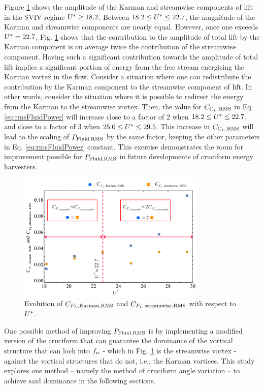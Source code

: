\documentclass[oneside]{utmthesis}
\begin{document}
Figure \ref{fig:karmanStreamwiseComponents} shows the \rms{} amplitude of the Karman and streamwise components of lift in the SVIV regime $U^{*} \geq 18.2$. Between $18.2 \leq U^{*} \leq 22.7$, the magnitude of the Karman and streamwise components are nearly equal. However, once one exceeds $U^{*} = 22.7$, Fig. \ref{fig:karmanStreamwiseComponents} shows that the contribution to the \rms{} amplitude of total lift by the Karman component is on average twice the contribution of the streamwise component. Having such a significant contribution towards the \rms{} amplitude of total lift implies a significant portion of energy from the free stream energising the Karman vortex in the flow. Consider a situation where one can redistribute the contribution by the Karman component to the streamwise component of lift. In other words, consider the situation where it is possible to redirect the energy from the Karman to the streamwise vortex. Then, the value for $C_{\text{C}_{L},\text{RMS}}$ in Eq. \ref{eq:rmsFluidPower} will increase close to a factor of 2 when $18.2 \leq U^{*} \leq 22.7$, and close to a factor of 3 when $25.0 \leq U^{*} \leq 29.5$. This increase in $C_{\text{C}_{L},\text{RMS}}$ will lead to the scaling of $P_{\text{Fluid,RMS}}$ by the same factor, keeping the other parameters in Eq. \ref{eq:rmsFluidPower} constant. This exercise demonstrates the room for improvement possible for $P_{\text{Fluid,RMS}}$ in future developments of cruciform energy harvesters.

\begin{figure}[H]
  \centering
  \includegraphics[width=0.8\textwidth]{figs/karmanStreamwiseComponents}
  \caption{Evolution of $C_{F_{L},\text{Karman},\text{RMS}}$ and $C_{F_{L},\text{streamwise},\text{RMS}}$ with respect to $U^{*}$.}
  \label{fig:karmanStreamwiseComponents}
\end{figure}

One possible method of improving $P_{\text{Fluid,RMS}}$ is by implementing a modified version of the cruciform that can guarantee the dominance of the vortical structure that can lock into $f_{n}$ - which in Fig. \ref{fig:karmanStreamwiseComponents} is the streamwise vortex - against the vortical structures that do not, i.e., the Karman vortices. This study explores one method -- namely the method of cruciform angle variation -- to achieve said dominance in the following sections.
\end{document}
